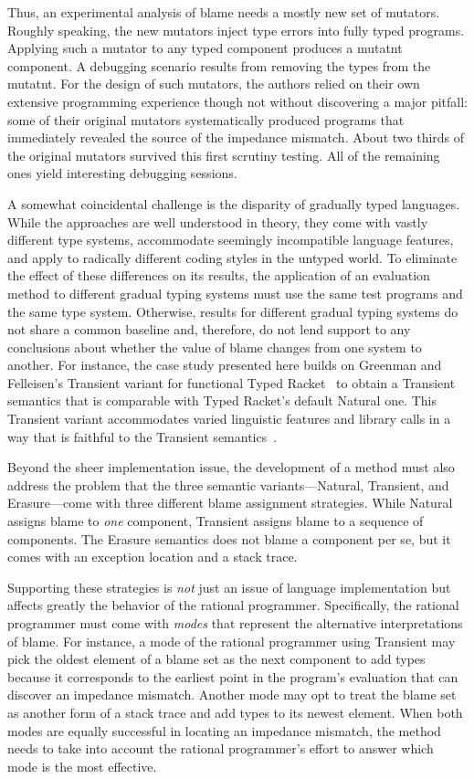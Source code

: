Thus, an experimental analysis of blame needs a mostly new set of mutators.
Roughly speaking, the new mutators inject type errors into fully typed programs.
Applying such a mutator to any typed component produces a mutatnt component.  A
debugging scenario results from removing the types from the mutatnt. For the
design of such mutators, the authors relied on their own extensive programming
experience though not without discovering a major pitfall: some of their original
mutators systematically produced programs that immediately revealed the source of
the impedance mismatch. About two thirds of the original mutators survived this
first scrutiny testing. All of the remaining ones yield interesting debugging
sessions. 

A somewhat coincidental challenge is the disparity of gradually typed
languages. While the approaches are well understood in theory, they come with
vastly different type systems, accommodate seemingly incompatible language
features, and apply to radically different coding styles in the untyped world.
To eliminate the effect of these differences on its results, the application of
an evaluation method to different gradual typing systems must use the same test
programs and the same type system. Otherwise, results for different gradual
typing systems do not share a common baseline and, therefore, do not lend support
to any conclusions about whether the value of blame changes from one system to
another. For instance, the case study presented here builds on Greenman and
Felleisen's Transient variant for functional Typed Racket~\cite{gf-icfp-2018} to
obtain a Transient semantics that is comparable with Typed Racket's default
Natural one. This Transient variant accommodates varied linguistic features and
library calls in a way that is faithful to the Transient
semantics~\cite{vss-popl-2017}.

Beyond the sheer implementation issue, the development of a method must also
address the problem that the three semantic variants---Natural, Transient, and
Erasure---come with three different blame assignment strategies.  While Natural
assigns blame to {\em one\/} component, Transient assigns blame to a sequence of
components. The Erasure semantics does not blame a component per se, but it comes
with an exception location and a stack trace.

Supporting these strategies is {\em not\/} just an issue of language
implementation but affects greatly the behavior of the rational
programmer.  Specifically, the rational programmer must come with
\emph{modes} that represent the alternative interpretations of blame.  For
instance, a mode of the rational programmer using Transient may pick the
oldest element of a blame set as the next component to add types because
it corresponds to the earliest point in the program's evaluation that can
discover an impedance mismatch.  Another mode may opt to treat the blame
set as another form of a stack trace and add types to its newest element.
When both modes are equally successful in locating an impedance mismatch,
the method needs to take into account the rational programmer's effort
to answer which mode is the most effective. 

